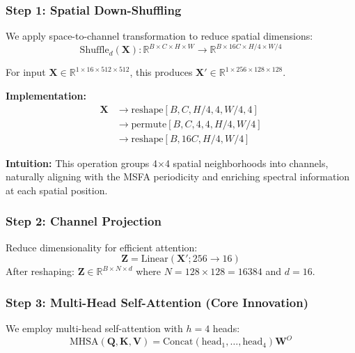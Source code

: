 \documentclass[conference]{IEEEtran}
\begin{document}
\subsubsection{Step 1: Spatial Down-Shuffling}

We apply space-to-channel transformation to reduce spatial dimensions:
\begin{equation}
\text{Shuffle}_d(\mathbf{X}) : \mathbb{R}^{B \times C \times H \times W} \rightarrow \mathbb{R}^{B \times 16C \times H/4 \times W/4}
\end{equation}

For input $\mathbf{X} \in \mathbb{R}^{1 \times 16 \times 512 \times 512}$, this produces $\mathbf{X}' \in \mathbb{R}^{1 \times 256 \times 128 \times 128}$.

\textbf{Implementation:}
\begin{equation}
\begin{aligned}
\mathbf{X} &\rightarrow \text{reshape}[B, C, H/4, 4, W/4, 4] \\
&\rightarrow \text{permute}[B, C, 4, 4, H/4, W/4] \\
&\rightarrow \text{reshape}[B, 16C, H/4, W/4]
\end{aligned}
\end{equation}

\textbf{Intuition:} This operation groups 4×4 spatial neighborhoods into channels, naturally aligning with the MSFA periodicity and enriching spectral information at each spatial position.

\subsubsection{Step 2: Channel Projection}

Reduce dimensionality for efficient attention:
\begin{equation}
\mathbf{Z} = \text{Linear}(\mathbf{X}'; 256 \rightarrow 16)
\end{equation}
After reshaping: $\mathbf{Z} \in \mathbb{R}^{B \times N \times d}$ where $N = 128 \times 128 = 16384$ and $d = 16$.

\subsubsection{Step 3: Multi-Head Self-Attention (Core Innovation)}

We employ multi-head self-attention with $h=4$ heads:
\begin{equation}
\text{MHSA}(\mathbf{Q}, \mathbf{K}, \mathbf{V}) = \text{Concat}(\text{head}_1, \ldots, \text{head}_4)\mathbf{W}^O
\end{equation}
\end{document}
